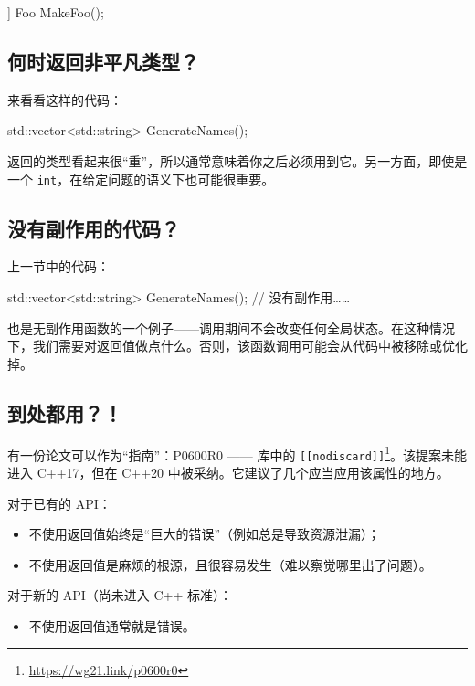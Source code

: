 \begin{codebox}[cpp]
[[nodiscard]] Foo MakeFoo();
\end{codebox}

\subsection{何时返回非平凡类型？}

来看看这样的代码：

\begin{codebox}[cpp]
std::vector<std::string> GenerateNames();
\end{codebox}

返回的类型看起来很“重”，所以通常意味着你之后必须用到它。另一方面，即使是一个 \texttt{int}，在给定问题的语义下也可能很重要。

\subsection{没有副作用的代码？}

上一节中的代码：

\begin{codebox}[cpp]
std::vector<std::string> GenerateNames(); // 没有副作用……
\end{codebox}

也是无副作用函数的一个例子——调用期间不会改变任何全局状态。在这种情况下，我们需要对返回值做点什么。否则，该函数调用可能会从代码中被移除或优化掉。

\subsection{到处都用？！}

有一份论文可以作为“指南”：P0600R0 —— 库中的 \texttt{\texttt{[[nodiscard]]}}\footnote{\url{https://wg21.link/p0600r0}}。该提案未能进入 C++17，但在 C++20 中被采纳。它建议了几个应当应用该属性的地方。

对于已有的 API：
\begin{itemize}
\item 不使用返回值始终是“巨大的错误”（例如总是导致资源泄漏）；
\item 不使用返回值是麻烦的根源，且很容易发生（难以察觉哪里出了问题）。
\end{itemize}

对于新的 API（尚未进入 C++ 标准）：
\begin{itemize}
\item 不使用返回值通常就是错误。
\end{itemize}

